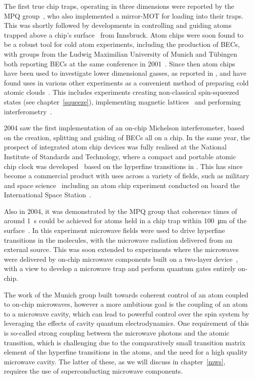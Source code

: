 The first true chip traps, operating in three dimensions were reported by the
MPQ group~\cite{Reichel1999}, who also implemented a mirror-MOT for loading
\esRb{} into their traps. This was shortly followed by developments in
controlling and guiding \Li{} atoms trapped above a chip's
surface~\cite{Folman2000} from Innsbruck.
%
Atom chips were soon found to be a robust tool for cold atom experiments,
including the production of BECs, with groups from the Ludwig Maximilian
University of Munich and T\"ubingen both reporting \esRb{} BECs at the same
conference in 2001~\cite{Hansel2001, Ott2001}. Since then atom chips have been
used to investigate lower dimensional gasses, as reported in
, and have found
uses in various other experiments as a convenient method of preparing cold
atomic clouds~\cite{PhysRevLett.104.073604}.
%
This includes experiments creating non-classical spin-squeezed states (see
chapter~\ref{squeeze}), implementing magnetic lattices~\cite{Gerritsma2007} and
performing interferometry~\cite{Wang2005}.

2004 saw the first implementation of an on-chip Michelson interferometer, based
on the creation, splitting and guiding of BECs all on a chip. In the same year,
the prospect of integrated atom chip devices was fully realised at the National
Institute of Standards and Technology, where a compact and portable atomic chip
clock was developed~\cite{Knappe2004} based on the hyperfine transitions in
\Cs{}. This has since become a commercial product with uses across a variety of
fields, such as military and space science~\cite{RAMIREZMARTINEZ2011247}
including an atom chip experiment conducted on board the International Space
Station~\cite{Frye2021}.

Also in 2004, it was demonstrated by the MPQ group that coherence times of
around \SI{1}{\second} could be achieved for \esRb{} atoms held in a chip trap
within \SI{100}{\micro\meter} of the surface~\cite{Treutlein2004}. In this
experiment microwave fields were used to drive hyperfine transitions in the
molecules, with the microwave radiation delivered from an external source. This
was soon extended to experiments where the microwaves were delivered by on-chip
microwave components built on a two-layer device~\cite{Treutlein2008,
Boehi2009}, with a view to develop a microwave trap and perform quantum
gates entirely on-chip.

The work of the Munich group built towards coherent control of an atom coupled
to on-chip microwaves, however a more ambitious goal is the coupling of an atom
to a microwave cavity, which can lead to powerful control over the spin system
by leveraging the effects of cavity quantum electrodynamics. One requirement of
this is so-called strong coupling between the microwave photons and the atomic
transition, which is challenging due to the comparatively small transition
matrix element of the hyperfine transitions in the atoms, and the need for a
high quality microwave cavity. The latter of these, as we will discuss in
chapter~\ref{mws}, requires the use of superconducting microwave components.

